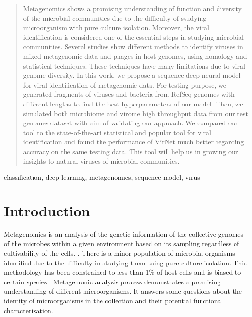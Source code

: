 \documentclass[conference]{IEEEtran}
\begin{document}
\maketitle  

\begin{abstract}Metagenomics shows a promising understanding of function and diversity of the microbial communities due to the difficulty of studying microorganism with pure culture isolation. Moreover, the viral identification is considered one of the essential steps in studying microbial communities. Several studies show different methods to identify viruses in mixed metagenomic data and phages in host genomes, using homology and statistical techniques. These techniques have many limitations due to viral genome diversity. In this work, we propose a sequence deep neural model for viral identification of metagenomic data. For testing purpose, we generated fragments of viruses and bacteria from RefSeq genomes with different lengths to find the best hyperparameters of our model. Then, we simulated both microbiome and virome high throughput data from our test genomes dataset with aim of validating our approach. 
We compared our tool to the state-of-the-art statistical and popular tool for viral identification and found the performance of VirNet much better regarding accuracy 
on the same testing data. This tool will help us in growing our insights to natural viruses of microbial communities.

\end{abstract}
\begin{IEEEkeywords}
	classification, deep learning, metagenomics, sequence model, virus
\end{IEEEkeywords}


\section{Introduction}

Metagenomics is an analysis of the genetic information of the collective genomes of the microbes within a given environment based on its sampling regardless of cultivability of the cells. \cite{izard2014metagenomics}. There is a minor population of microbial organisms identified due to the difficulty in studying them using pure culture isolation. This methodology has been constrained to less than 1\% of host cells and is biased to certain species \cite{labonte2015single}.
Metagenomic analysis process demonstrates a promising understanding of different microorganisms. It answers some questions about the identity of microorganisms in the collection and their potential functional characterization.
\end{document}
